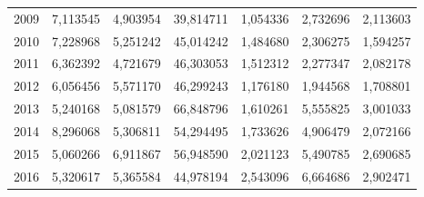 \begin{table}
\begin{tabular}{p{1cm}p{2cm}p{2cm}p{2cm}p{2cm}p{2cm}p{2cm}}
 2009 &                               7,113545 &                                    4,903954 &                      39,814711 &                     1,054336 &   2,732696 &                            2,113603 \\
 2010 &                               7,228968 &                                    5,251242 &                      45,014242 &                     1,484680 &   2,306275 &                            1,594257 \\
 2011 &                               6,362392 &                                    4,721679 &                      46,303053 &                     1,512312 &   2,277347 &                            2,082178 \\
 2012 &                               6,056456 &                                    5,571170 &                      46,299243 &                     1,176180 &   1,944568 &                            1,708801 \\
 2013 &                               5,240168 &                                    5,081579 &                      66,848796 &                     1,610261 &   5,555825 &                            3,001033 \\
 2014 &                               8,296068 &                                    5,306811 &                      54,294495 &                     1,733626 &   4,906479 &                            2,072166 \\
 2015 &                               5,060266 &                                    6,911867 &                      56,948590 &                     2,021123 &   5,490785 &                            2,690685 \\
 2016 &                               5,320617 &                                    5,365584 &                      44,978194 &                     2,543096 &   6,664686 &                            2,902471 \\
\bottomrule
\end{tabular}
\end{table}
